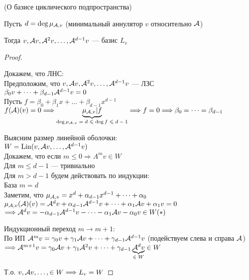 \begin{theorem}(О базисе циклического подпространства)
    
    Пусть $d = \deg \mu_{\mathcal{A}, v}$ (минимальный аннулятор $v$ относительно $\mathcal{A}$)

    Тогда $v, \mathcal{A} v, \mathcal{A}^2 v, \dots, \mathcal{A}^{d - 1} v $ --- базис $L_v$

    \begin{proof}
    $ $

    \quad Докажем, что ЛНС: \\
    Предположим, что $v, \mathcal{A} v, \mathcal{A}^2 v, \dots, \mathcal{A}^{d - 1} v $ --- ЛЗС \\
    $\beta_0 v + \dots + \beta_{d - 1} \mathcal{A}^{d - 1} v = 0$ \\
    Пусть $ f = \beta_0 + \beta_1 x + \dots + \beta_{d - 1} x^{d - 1} $ \\
    $ f(\mathcal{A})(v) = 0 \Longrightarrow  \underbrace{\mu_{\mathcal{A}, v} | f}_{\text{$ \deg{ \mu_{\mathcal{A}, v}}= d \leqslant \deg{f} \leqslant d - 1 $}}  \Longrightarrow f = 0 \Longrightarrow \beta_0 = \dots = \beta_{d - 1}$

    \quad Выясним размер линейной оболочки: \\ 
    $ W = \operatorname{Lin} (v, \mathcal{A} v, \dots, \mathcal{A}^{d - 1} v) $ \\
    Докажем, что если $m \leqslant 0 \Longrightarrow A^m v \in W$ \\
    Для $ m \leqslant d - 1$ --- тривиально \\
    Для $m > d - 1$ будем действовать по индукции: \\
    \quad База $m = d$ \\
    Заметим, что $\mu_{\mathcal{A}, v} = x^d + \alpha_{d - 1} x^{d - 1} + \dots + \alpha_0$ \\
    $\mu_{\mathcal{A}, v}(\mathcal{A})(v) = \mathcal{A}^dv + \alpha_{d - 1} \mathcal{A}^{d - 1}v + \dots + \alpha_1 \mathcal{A} v + \alpha_1 v = 0$ \\
    $\Longrightarrow \mathcal{A}^d v = - \alpha_{d - 1} \mathcal{A}^{d - 1}v - \dots - \alpha_1 \mathcal{A} v - \alpha_0 v \in W (*)$ 

    \quad Индукционный переход $m \to m + 1:$ \\
    По ИП $\mathcal{A}^m v = \gamma_0 v + \gamma_1 \mathcal{A} v + \dots + \gamma_{d - 1} \mathcal{A}^{d - 1} v$ (подействуем слева и справа $\mathcal{A}$)
    $\Longrightarrow \mathcal{A}^{m + 1} v = \gamma_0 \mathcal{A} v + \gamma_1 \mathcal{A}^2 v + \dots + \gamma_{d - 1} \underbrace{\mathcal{A}^{d} v}_{\text{$ \in W $}}  \in W$

    Т.о. $v, \mathcal{A} v, \dots, \in W \Longrightarrow L_v = W$
    \end{proof}
\end{theorem}

